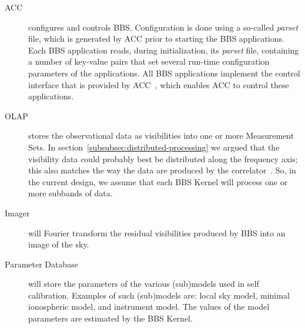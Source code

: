 \documentclass[10pt]{lofar}
\begin{document}
\begin{description}
\item [ACC] configures and controls BBS. Configuration is done using a
so-called \emph{parset} file, which is generated by ACC prior to starting the
BBS applications. Each BBS application reads, during initialization, its
\emph{parset} file, containing a number of key-value pairs that set several
run-time configuration parameters of the applications. All BBS applications
implement the control interface that is provided by
ACC~\cite{LOFAR-ASTRON-SDD-037}, which enables ACC to control these
applications.
\item [OLAP] stores the observational data as visibilities into one or more
Measurement Sets. In section~\ref{subsubsec:distributed-processing} we argued
that the visibility data could probably best be distributed along the frequency
axis; this also matches the way the data are produced by the
correlator~\cite{LOFAR-ASTRON-SDD-036}. So, in the current design, we assume
that each BBS Kernel will process one or more subbands of data.
\item [Imager] will Fourier transform the residual visibilities produced by BBS
into an image of the sky.
\item [Parameter Database] \sloppy will store the parameters of the various
(sub)models used in self calibration. Examples of such (sub)models are: local
sky model, minimal ionospheric model, and instrument model. The values of the
model parameters are estimated by the BBS Kernel.
\end{description}
\end{document}
